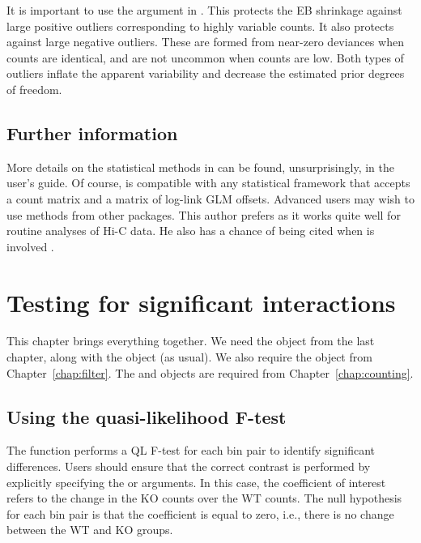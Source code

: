 \documentclass{report}\usepackage[]{graphicx}\usepackage[usenames,dvipsnames]{color}
\newenvironment{combox}
{ \definecolor{shadecolor}{RGB}{255, 240, 240} \begin{shaded}\begin{center}\begin{minipage}[t]{0.95\textwidth} }
{ \end{minipage}\end{center}\end{shaded} \definecolor{shadecolor}{RGB}{240,240,240} }
\begin{document}
It is important to use the  argument in  \cite{phipson2016robust}.
This protects the EB shrinkage against large positive outliers corresponding to highly variable counts.
It also protects against large negative outliers.
These are formed from near-zero deviances when counts are identical, and are not uncommon when counts are low.
Both types of outliers inflate the apparent variability and decrease the estimated prior degrees of freedom.

\section{Further information}
More details on the statistical methods in  can be found, unsurprisingly, in the  user's guide.
Of course,  is compatible with any statistical framework that accepts a count matrix and a matrix of log-link GLM offsets.
Advanced users may wish to use methods from other packages.
This author prefers  as it works quite well for routine analyses of Hi-C data.
He also has a chance of being cited when  is involved \cite{chen2014differential}.

\chapter{Testing for significant interactions}

\begin{combox}
This chapter brings everything together.
We need the  object from the last chapter, along with the  object (as usual).
We also require the  object from Chapter~\ref{chap:filter}.
The  and  objects are required from Chapter~\ref{chap:counting}.
\end{combox}

\section{Using the quasi-likelihood F-test}
The  function performs a QL F-test for each bin pair to identify significant differences.
Users should ensure that the correct contrast is performed by explicitly specifying the  or  arguments.
In this case, the coefficient of interest refers to the change in the KO counts over the WT counts.
The null hypothesis for each bin pair is that the coefficient is equal to zero, i.e., there is no change between the WT and KO groups.
\end{document}
